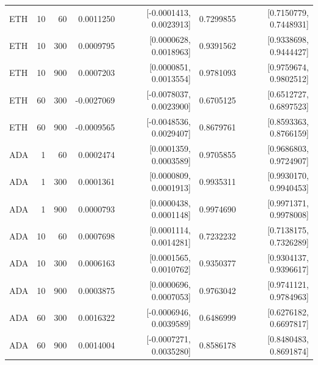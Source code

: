 \documentclass[12pt]{article}
\theoremstyle{definition}
\theoremstyle{remark}
\begin{document}
\begin{table}[htbp]
{\begin{tabular}{lrrrrrr}
ETH & 10 & 60 & 0.0011250 & [-0.0001413, 0.0023913] & 0.7299855 & [0.7150779, 0.7448931] \\
ETH & 10 & 300 & 0.0009795 & [0.0000628, 0.0018963] & 0.9391562 & [0.9338698, 0.9444427] \\
ETH & 10 & 900 & 0.0007203 & [0.0000851, 0.0013554] & 0.9781093 & [0.9759674, 0.9802512] \\
ETH & 60 & 300 & -0.0027069 & [-0.0078037, 0.0023900] & 0.6705125 & [0.6512727, 0.6897523] \\
ETH & 60 & 900 & -0.0009565 & [-0.0048536, 0.0029407] & 0.8679761 & [0.8593363, 0.8766159] \\
ADA & 1 & 60 & 0.0002474 & [0.0001359, 0.0003589] & 0.9705855 & [0.9686803, 0.9724907] \\
ADA & 1 & 300 & 0.0001361 & [0.0000809, 0.0001913] & 0.9935311 & [0.9930170, 0.9940453] \\
ADA & 1 & 900 & 0.0000793 & [0.0000438, 0.0001148] & 0.9974690 & [0.9971371, 0.9978008] \\
ADA & 10 & 60 & 0.0007698 & [0.0001114, 0.0014281] & 0.7232232 & [0.7138175, 0.7326289] \\
ADA & 10 & 300 & 0.0006163 & [0.0001565, 0.0010762] & 0.9350377 & [0.9304137, 0.9396617] \\
ADA & 10 & 900 & 0.0003875 & [0.0000696, 0.0007053] & 0.9763042 & [0.9741121, 0.9784963] \\
ADA & 60 & 300 & 0.0016322 & [-0.0006946, 0.0039589] & 0.6486999 & [0.6276182, 0.6697817] \\
ADA & 60 & 900 & 0.0014004 & [-0.0007271, 0.0035280] & 0.8586178 & [0.8480483, 0.8691874] \\
\bottomrule\end{tabular}}
\end{table}
\end{document}
